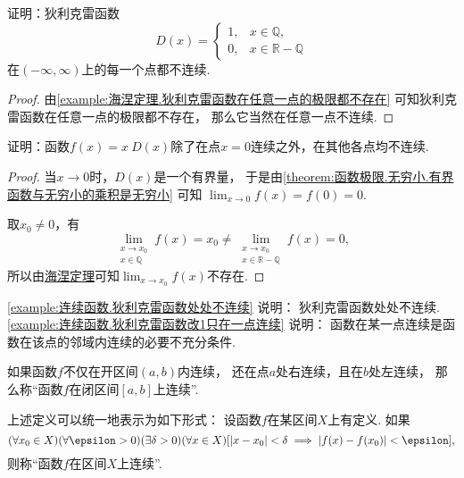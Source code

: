 \begin{example}\label{example:连续函数.狄利克雷函数处处不连续}
证明：狄利克雷函数\[
	D(x) = \left\{ \begin{array}{ll}
		1, & x \in \mathbb{Q}, \\
		0, & x \in \mathbb{R}-\mathbb{Q}
	\end{array} \right.
\]在\((-\infty,\infty)\)上的每一个点都不连续.
\begin{proof}
由\cref{example:海涅定理.狄利克雷函数在任意一点的极限都不存在}
可知狄利克雷函数在任意一点的极限都不存在，
那么它当然在任意一点不连续.
\end{proof}
\end{example}
\begin{example}\label{example:连续函数.狄利克雷函数改1只在一点连续}
证明：函数\(f(x) = x~D(x)\)除了在点\(x=0\)连续之外，在其他各点均不连续.
\begin{proof}
当\(x\to0\)时，\(D(x)\)是一个有界量，
于是由\cref{theorem:函数极限.无穷小.有界函数与无穷小的乘积是无穷小} 可知
\(\lim_{x\to0} f(x) = f(0) = 0\).

取\(x_0\neq0\)，有\[
	\lim_{\substack{x \to x_0 \\ x \in \mathbb{Q}}} f(x)
	= x_0
	\neq
	\lim_{\substack{x \to x_0 \\ x \in \mathbb{R}-\mathbb{Q}}} f(x)
	= 0,
\]
所以由\hyperref[theorem:极限.海涅定理]{海涅定理}可知\(\lim_{x \to x_0} f(x)\)不存在.
\end{proof}
\end{example}
\begin{remark}
\cref{example:连续函数.狄利克雷函数处处不连续} 说明：
狄利克雷函数处处不连续.
\cref{example:连续函数.狄利克雷函数改1只在一点连续} 说明：
函数在某一点连续是函数在该点的邻域内连续的必要不充分条件.
\end{remark}

\begin{definition}
如果函数\(f\)不仅在开区间\((a,b)\)内连续，
还在点\(a\)处右连续，且在\(b\)处左连续，
那么称“函数\(f\)在闭区间\([a,b]\)上连续”.
\end{definition}

\begin{remark}
上述定义可以统一地表示为如下形式：
设函数\(f\)在某区间\(X\)上有定义.
如果\[
	(\forall x_0\in X)
	(\forall\epsilon>0)
	(\exists\delta>0)
	(\forall x\in X)
	[
		\abs{x-x_0}<\delta
		\implies
		\abs{f(x)-f(x_0)}<\epsilon
	],
\]
则称“函数\(f\)在区间\(X\)上连续”.
\end{remark}

